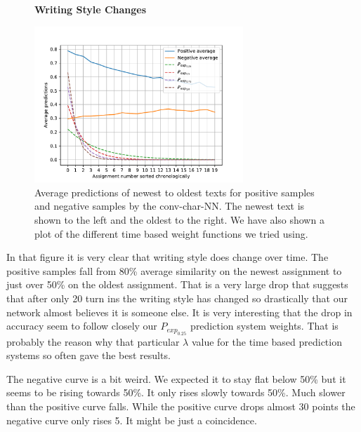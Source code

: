 \begin{figure}
    \centering
    \textbf{Writing Style Changes}\par\medskip
    \includegraphics[width=0.7\textwidth]{./pictures/discussion/writing_style_change}
    \caption{Average predictions of newest to oldest texts for positive samples
        and negative samples by the \gls{conv-char-NN}. The newest text is shown
        to the left and the oldest to the right. We have also shown a plot of
        the different time based weight functions we tried using.}
    \label{fig:writing_style_changes}
\end{figure}

In that figure it is very clear that writing style does change over time. The
positive samples fall from 80\% average similarity on the newest assignment to
just over 50\% on the oldest assignment. That is a very large drop that suggests
that after only 20 turn ins the writing style has changed so drastically that
our network almost believes it is someone else. It is very interesting that the
drop in accuracy seem to follow closely our $P_{exp_{0.25}}$ prediction system
weights. That is probably the reason why that particular $\lambda$ value for the
time based prediction systems so often gave the best results.

The negative curve is a bit weird. We expected it to stay flat below 50\% but
it seems to be rising towards 50\%. It only rises slowly towards 50\%. Much
slower than the positive curve falls. While the positive curve drops almost 30
points the negative curve only rises 5. It might be just a coincidence.


